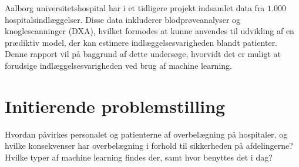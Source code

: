 Aalborg universitetshospital har i et tidligere projekt indsamlet data fra $1.000$ hospitalsindlæggelser. Disse data inkluderer blodprøveanalyser og knoglescanninger (DXA), hvilket formodes at kunne anvendes til udvikling af en prædiktiv model, der kan estimere indlæggelsesvarigheden blandt patienter. Denne rapport vil på baggrund af dette undersøge, hvorvidt det er muligt at forudsige indlæggelsesvarigheden ved brug af machine learning. 



\section{Initierende problemstilling} 
Hvordan påvirkes personalet og patienterne af overbelægning på hospitaler, og hvilke konsekvenser har overbelægning i forhold til sikkerheden på afdelingerne?
Hvilke typer af machine learning findes der, samt hvor benyttes det i dag?


